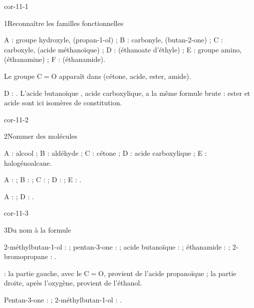 \corrigesSouples

\begin{blocLivre}{cor-11-1}
\begin{corrige}{1}{Reconnaître les familles fonctionnelles}
\begin{questions}
\item A : groupe hydroxyle,  (propan-1-ol) ; B : carbonyle,  (butan-2-one) ;
C : carboxyle,  (acide méthanoïque) ; D :  (éthanoate d'éthyle) ;
E : groupe amino,  (éthanamine) ; F :  (éthanamide).
\item Le groupe C$=$O apparaît dans  (cétone, acide, ester, amide).
\item D : . L'acide butanoïque , acide carboxylique, a la même formule brute :
ester et acide sont ici isomères de constitution.
\end{questions}
\end{corrige}
\end{blocLivre}
\begin{blocLivre}{cor-11-2}
\begin{corrige}{2}{Nommer des molécules}
\begin{questions}
\item A : alcool ; B : aldéhyde ; C : cétone ; D : acide carboxylique ; E : halogénoalcane.
\item A :  ; B :  ; C :  ;
D :  ; E : .
\item A :  ; D : .
\end{questions}
\end{corrige}
\end{blocLivre}
\begin{blocLivre}{cor-11-3}
\begin{corrige}{3}{Du nom à la formule}
\begin{questions}
\item 2-méthylbutan-1-ol :  ; pentan-3-one :  ; acide
butanoïque :  ; éthanamide :  ; 2-bromopropane : .
\item {}\; : la partie gauche, avec le C$=$O, provient de
l'acide propanoïque ; la partie droite, après l'oxygène, provient de l'éthanol.
\item Pentan-3-one :  ; 2-méthylbutan-1-ol : .
\end{questions}
\end{corrige}
\end{blocLivre}
